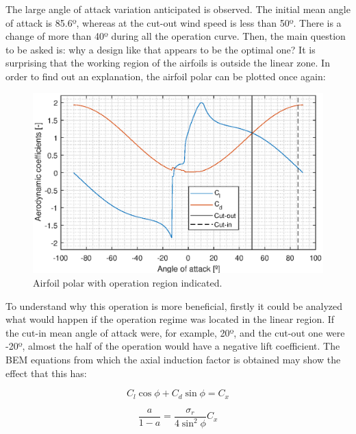 \documentclass[../TFG_Report.tex]{subfiles}
\begin{document}
The large angle of attack variation anticipated is observed. The initial mean angle of attack is 85.6º, whereas at the cut-out wind speed is less than 50º. There is a change of more than 40º during all the operation curve. Then, the main question to be asked is: why a design like that appears to be the optimal one? It is surprising that the working region of the airfoils is outside the linear zone. In order to find out an explanation, the airfoil polar can be plotted once again: \\

\begin{figure}[h!]
	\centering
	\includegraphics[width=1\linewidth]{Images/Aerodynamic_Design/First_Polars_OpRegion}
	\caption[]{Airfoil polar with operation region indicated.}
	\label{fig:AngleOfAttackPolarsFirst}
\end{figure} 
\FloatBarrier

To understand why this operation is more beneficial, firstly it could be analyzed what would happen if the operation regime was located in the linear region. If the cut-in mean angle of attack were, for example, 20º, and the cut-out one were -20º, almost the half of the operation would have a negative lift coefficient. The BEM equations from which the axial induction factor is obtained may show the effect that this has: 

\begin{equation}
C_l \cos \phi + C_d \sin \phi = C_x
\end{equation}


\begin{equation}
\dfrac{a}{1-a} = \dfrac{\sigma_r}{4 \sin^2\phi} C_x
\end{equation}
\end{document}

